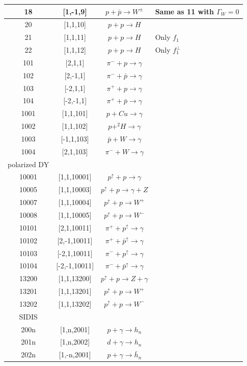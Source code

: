 \documentclass[prd,nofootinbib,eqsecnum,final]{revtex4}
\renewcommand{\(}{\left(}
\renewcommand{\)}{\right)}
\renewcommand{\[}{\left[}
\renewcommand{\]}{\right]}
\begin{document}
\begin{center}
\begin{longtable}{||c|c||c|p{8cm}||}
\\\hline
18 & [1,-1,9] & $p+\bar p\to W^\pm$ & Same as 11 with $\Gamma_W=0$
\\\hline
20 & [1,1,10] & $p+p\to H$ &
\\\hline
21 & [1,1,11] & $p+p\to H$ & Only $f_1$
\\\hline
22 & [1,1,12] & $p+p\to H$ & Only $f_1^\perp$
\\\hline
101 & [2,1,1] & $\pi^-+p\to \gamma$ &
\\\hline
102 & [2,-1,1] & $\pi^-+\bar p\to \gamma$ &
\\\hline
103 & [-2,1,1] & $\pi^++p\to \gamma$ &
\\\hline
104 & [-2,-1,1] & $\pi^++\bar p\to \gamma$ &
\\\hline
1001 & [1,1,101] & $p+Cu\to \gamma$ & 
\\\hline
1002 & [1,1,102] & $p+^2H\to \gamma$ & 
\\\hline
1003 & [-1,1,103] & $\bar p+W\to \gamma$ & 
\\\hline
1004 & [2,1,103] & $\pi^-+W\to \gamma$ & 
\\\hline\hline
polarized DY
\\\hline\hline
10001 & [1,1,10001] & $p^\uparrow+p\to \gamma$ & 
\\\hline
10005 & [1,1,10003] & $p^\uparrow+p\to \gamma+Z$ & 
\\\hline
10007 & [1,1,10004] & $p^\uparrow+p\to W^+$ & 
\\\hline
10008 & [1,1,10005] & $p^\uparrow+p\to W^-$ & 
\\\hline
10101 & [2,1,10011] & $\pi^++p^\uparrow\to \gamma$ & 
\\\hline
10102 & [2,-1,10011] & $\pi^++\bar p^\uparrow\to \gamma$ & 
\\\hline
10103 & [-2,1,10011] & $\pi^-+p^\uparrow\to \gamma$ & 
\\\hline
10104 & [-2,-1,10011] & $\pi^-+\bar p^\uparrow\to \gamma$ & 
\\\hline
13200 & [1,1,13200] & $p^\uparrow+p\to Z+\gamma$ & 
\\\hline
13201 & [1,1,13201] & $p^\uparrow+p\to W^+$ & 
\\\hline
13202 & [1,1,13202] & $p^\uparrow+p\to W^-$ & 
\\\hline\hline
 SIDIS
\\\hline\hline
200n & [1,n,2001] & $p+\gamma\to h_n$ & 
\\\hline
201n & [1,n,2002] & $d+\gamma\to h_n$ & 
\\\hline
202n & [1,-n,2001] & $p+\gamma\to \bar h_n$ & 

\end{longtable}
\end{center}
\end{document}
